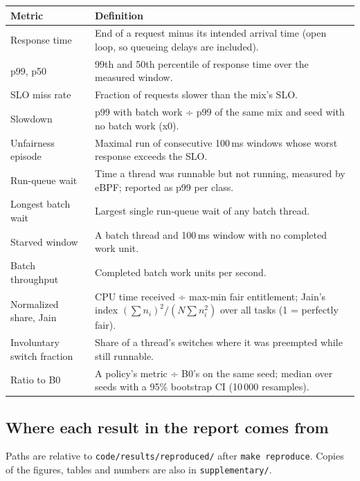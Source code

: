 \documentclass[10.5pt,a4paper]{article}
\newcommand{\f}[1]{\texttt{#1}}
\begin{document}
\begin{tabularx}{\textwidth}{@{}l L@{}}
\toprule
\textbf{Metric} & \textbf{Definition} \\
\midrule
Response time & End of a request minus its intended arrival time (open loop, so queueing delays are included). \\
p99, p50 & 99th and 50th percentile of response time over the measured window. \\
SLO miss rate & Fraction of requests slower than the mix's SLO. \\
Slowdown & p99 with batch work ÷ p99 of the same mix and seed with no batch work (x0). \\
Unfairness episode & Maximal run of consecutive 100\,ms windows whose worst response exceeds the SLO. \\
Run-queue wait & Time a thread was runnable but not running, measured by eBPF; reported as p99 per class. \\
Longest batch wait & Largest single run-queue wait of any batch thread. \\
Starved window & A batch thread and 100\,ms window with no completed work unit. \\
Batch throughput & Completed batch work units per second. \\
Normalized share, Jain & CPU time received ÷ max-min fair entitlement; Jain's index $(\sum n_i)^2 / (N \sum n_i^2)$ over all tasks (1 = perfectly fair). \\
Involuntary switch fraction & Share of a thread's switches where it was preempted while still runnable. \\
Ratio to B0 & A policy's metric ÷ B0's on the same seed; median over seeds with a 95\% bootstrap CI (10\,000 resamples). \\
\bottomrule
\end{tabularx}

\subsection{Where each result in the report comes from}
Paths are relative to \f{code/results/reproduced/} after \f{make reproduce}. Copies of the figures, tables and numbers are also in \f{supplementary/}.
\end{document}
